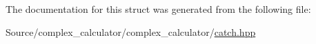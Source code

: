 The documentation for this struct was generated from the following file\+:\begin{DoxyCompactItemize}
\item 
Source/complex\+\_\+calculator/complex\+\_\+calculator/\mbox{\hyperlink{catch_8hpp}{catch.\+hpp}}\end{DoxyCompactItemize}
